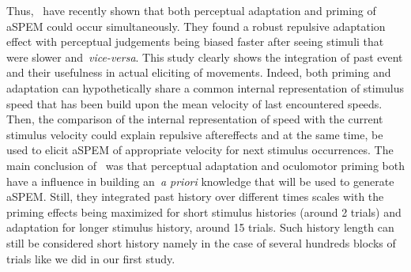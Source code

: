 \documentclass[profile,final,english, draft]{article}%
\begin{document}
Thus,~\citet{Maus2015} have recently shown that
both perceptual adaptation and priming of aSPEM could occur simultaneously.
They found a robust repulsive adaptation effect
with perceptual judgements being biased faster
after seeing stimuli that were slower and~\textit{vice-versa}.
This study clearly shows the integration of past event and
their usefulness in actual eliciting of movements.
Indeed, both priming and adaptation can hypothetically share
a common internal representation of stimulus speed
that has been build upon the mean velocity of last encountered speeds.
Then, the comparison of the internal representation of speed
with the current stimulus velocity could explain repulsive aftereffects and
at the same time, be used to elicit aSPEM
of appropriate velocity for next stimulus occurrences.
The main conclusion of~\citet{Maus2015}  was that
perceptual adaptation and oculomotor priming
both have a influence in building an~\textit{a priori} knowledge
that will be used to generate aSPEM.
Still, they integrated past history over different times scales
with the priming effects being maximized
for short stimulus histories (around 2 trials) and
adaptation for longer stimulus history, around 15 trials.
Such history length can still be considered
short history namely in the case of several hundreds blocks
of trials like we did in our first study.
\end{document}
